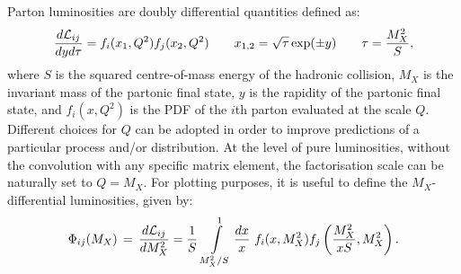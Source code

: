 \documentclass[withindex,glossary]{cam-thesis}
\begin{document}
Parton luminosities are doubly differential quantities defined as:
\begin{equation}
\frac{d{\cal L}_{ij}}{dyd\tau}=f_i(x_1,Q^2)f_j(x_2,Q^2)\qquad x_{1,2}=\sqrt{\tau}\exp(\pm
y)\qquad \tau=\frac{M_X^2}{S},
\end{equation}
where $S$ is the squared centre-of-mass energy of the hadronic collision, $M_X$ is the invariant mass
of the partonic final state, $y$ is the rapidity of the partonic final state, and 
$f_i(x,Q^2)$ is the PDF of the $i$th parton evaluated at the
scale $Q$. Different choices for $Q$ can be adopted in order to improve predictions
of a particular process and/or distribution.
At the level of pure luminosities, without the convolution with
any specific matrix element, the factorisation scale can be naturally
set to $Q = M_X$. For plotting purposes, it is useful to define the
$M_X$-differential luminosities, given by:
\begin{equation}
  \label{eq:lumidef}
\Phi_{ij}(M_X) \,=\,\frac{d{\cal L}_{ij}}{dM_X^2}=\frac{1}{S}\,\int\limits_{M_X^2/S}^1
\frac{dx}{x}\ f_i(x,M_X^2)f_j\left(\frac{M_X^2}{xS},M_X^2\right).
\end{equation}
\end{document}
